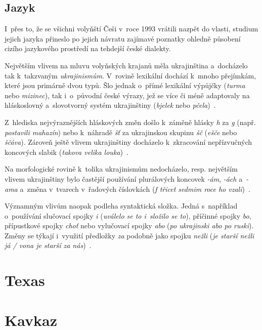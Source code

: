 \hypertarget{jazyk-1}{%
\subsection*{Jazyk}\label{jazyk-1}}

I~přes to, že se všichni volyňští Češi v~roce 1993 vrátili nazpět do vlasti, studium jejich jazyka přineslo po jejich návratu zajímavé poznatky ohledně působení cizího jazykového prostředí na tehdejší české dialekty.

Největším vlivem na mluvu volyňských krajanů měla ukrajinština a~docházelo tak k~takzvaným \emph{ukrajinismům}. V~rovině lexikální dochází k~mnoho přejímkám, které jsou primárně dvou typů. Šlo jednak o~přímé lexikální výpůjčky (\emph{turma} nebo \emph{mizinec}), tak i~o~původní české výrazy, jež se více či méně adaptovaly na hláskoslovný a~slovotvorný systém ukrajinštiny (\emph{bjelek} nebo \emph{pčela})~\parencite{Balhar2005}.

Z~hlediska nejvýraznějších hláskových změn došlo k~záměně hlásky \emph{h} za \emph{g} (např. \emph{postavili mahazín}) nebo k~náhradě \emph{šť} za ukrajinskou skupinu \emph{šč} (\emph{ešče} nebo \emph{ščáva}). Zároveň ještě vlivem ukrajinštiny docházelo k~zkracování nepřízvučných koncových slabik (\emph{takova velika louka})~\parencite{Jancakova2004}.

Na morfologické rovině k~tolika ukrajinismům nedocházelo, resp. největším vlivem ukrajinštiny bylo častější používání plurálových koncovek \emph{-ám}, \emph{-ách} a~\emph{-ama} a~změna v~tvarech v~řadových číslovkách (\emph{f třicet sedmim roce ho vzali})~\parencite{Jancakova2004}.

Významným vlivům naopak podleha syntaktická složka. Jedná s~například o~používání slučovací spojky \emph{i} (\emph{uválelo se to i~složilo se to}), příčinné spojky \emph{bo}, přípustkové spojky \emph{choť} nebo vylučovací spojky \emph{abo} (\emph{po ukrajinski abo po ruski}). Změny se týkají i~využití předložky \emph{za} podobně jako spojku \emph{nežli} (\emph{je starší nežli já / vona je starší za nás})~\parencite{Balhar2005}.

\hypertarget{texas}{%
\section{Texas}\label{texas}}

\hypertarget{kavkaz}{%
\section{Kavkaz}\label{kavkaz}}
